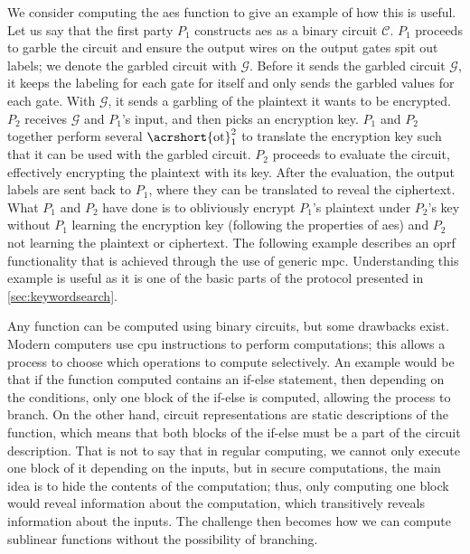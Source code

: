 We consider computing the \acrfull{aes} function to give an example of how this is useful. Let us say that the first party $ P_1 $ constructs \acrshort{aes} as a binary circuit $ \mathcal{C} $. $ P_1 $ proceeds to garble the circuit and ensure the output wires on the output gates spit out labels; we denote the garbled circuit with $ \mathcal{G} $. Before it sends the garbled circuit $ \mathcal{G} $, it keeps the labeling for each gate for itself and only sends the garbled values for each gate. With $ \mathcal{G} $, it sends a garbling of the plaintext it wants to be encrypted. $ P_2 $ receives $ \mathcal{G} $ and $ P_1 $'s input, and then picks an encryption key. $ P_1 $ and $ P_2 $ together perform several $\text{\acrshort{ot}}^2_1$ to translate the encryption key such that it can be used with the garbled circuit. $ P_2 $ proceeds to evaluate the circuit, effectively encrypting the plaintext with its key. After the evaluation, the output labels are sent back to $ P_1 $, where they can be translated to reveal the ciphertext. What $ P_1 $ and $ P_2 $ have done is to obliviously encrypt $ P_1 $'s plaintext under $ P_2 $'s key without $ P_1 $ learning the encryption key (following the properties of \acrshort{aes}) and $ P_2 $ not learning the plaintext or ciphertext. The following example describes an \acrshort{oprf} functionality that is achieved through the use of generic \acrshort{mpc}. Understanding this example is useful as it is one of the basic parts of the protocol presented in \cref{sec:keywordsearch}.

Any function can be computed using binary circuits, but some drawbacks exist. Modern computers use \acrshort{cpu} instructions to perform computations; this allows a process to choose which operations to compute selectively. An example would be that if the function computed contains an if-else statement, then depending on the conditions, only one block of the if-else is computed, allowing the process to branch. On the other hand, circuit representations are static descriptions of the function, which means that both blocks of the if-else must be a part of the circuit description. That is not to say that in regular computing, we cannot only execute one block of it depending on the inputs, but in secure computations, the main idea is to hide the contents of the computation; thus, only computing one block would reveal information about the computation, which transitively reveals information about the inputs. The challenge then becomes how we can compute sublinear functions without the possibility of branching.

